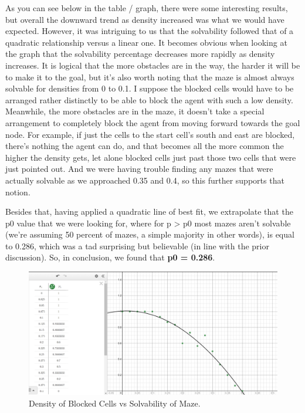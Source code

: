\documentclass{homeworg}
\begin{document}
As you can see below in the table / graph, there were some interesting results, but overall the downward trend as density increased was what we would have expected. However, it was intriguing to us that the solvability followed that of a quadratic relationship versus a linear one. It becomes obvious when looking at the graph that the solvability percentage decreases more rapidly as density increases. It is logical that the more obstacles are in the way, the harder it will be to make it to the goal, but it's also worth noting that the maze is almost always solvable for densities from 0 to 0.1. I suppose the blocked cells would have to be arranged rather distinctly to be able to block the agent with such a low density. Meanwhile, the more obstacles are in the maze, it doesn't take a special arrangement to completely block the agent from moving forward towards the goal node. For example, if just the cells to the start cell's south and east are blocked, there's nothing the agent can do, and that becomes all the more common the higher the density gets, let alone blocked cells just past those two cells that were just pointed out. And we were having trouble finding any mazes that were actually solvable as we approached 0.35 and 0.4, so this further supports that notion.

Besides that, having applied a quadratic line of best fit, we extrapolate that the p0 value that we were looking for, where for p > p0 most mazes aren’t solvable (we're assuming 50 percent of mazes, a simple majority in other words), is equal to 0.286, which was a tad surprising but believable (in line with the prior discussion). So, in conclusion, we found that \textbf{p0 = 0.286}.

\begin{figure}[h]
  	\centering
  	\includegraphics*[scale=0.3]{Q4 Data and Plot + Line of Best Fit.png}
	\caption{Density of Blocked Cells vs Solvability of Maze.}
	\label{fig:example}
\end{figure}
\end{document}

